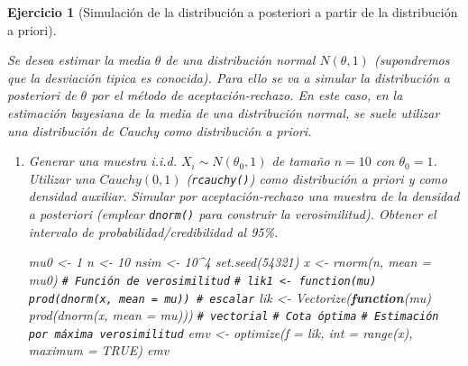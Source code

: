 \documentclass[
]{book}
\newenvironment{Shaded}{\begin{snugshade}}{\end{snugshade}}
\newcommand{\AttributeTok}[1]{\textcolor[rgb]{0.77,0.63,0.00}{#1}}
\newcommand{\CommentTok}[1]{\textcolor[rgb]{0.56,0.35,0.01}{\textit{#1}}}
\newcommand{\ConstantTok}[1]{\textcolor[rgb]{0.00,0.00,0.00}{#1}}
\newcommand{\ControlFlowTok}[1]{\textcolor[rgb]{0.13,0.29,0.53}{\textbf{#1}}}
\newcommand{\DecValTok}[1]{\textcolor[rgb]{0.00,0.00,0.81}{#1}}
\newcommand{\FunctionTok}[1]{\textcolor[rgb]{0.00,0.00,0.00}{#1}}
\newcommand{\NormalTok}[1]{#1}
\newcommand{\OtherTok}[1]{\textcolor[rgb]{0.56,0.35,0.01}{#1}}
\newcommand{\SpecialCharTok}[1]{\textcolor[rgb]{0.00,0.00,0.00}{#1}}
\theoremstyle{break}
\newtheorem{exercise}{Ejercicio}[chapter]
\theoremstyle{nonumberplain}
\renewcommand{\CommentTok}[1]{\textcolor[rgb]{0.41,0.41,0.41}{\texttt{#1}}}
\begin{document}
\begin{exercise}[Simulación de la distribución a posteriori a partir de la distribución a priori]
\protect\hypertarget{exr:post-pri-ar}{}\label{exr:post-pri-ar}

Se desea estimar la media \(\theta\) de una distribución normal \(N(\theta, 1)\) (supondremos que la desviación tipica es conocida).
Para ello se va a simular la distribución a posteriori de \(\theta\) por el método de aceptación-rechazo.
En este caso, en la estimación bayesiana de la media de una distribución normal, se suele utilizar una distribución de Cauchy como distribución a priori.

\begin{enumerate}
\def\labelenumi{\alph{enumi})}
\item
  Generar una muestra i.i.d. \(X_{i}\sim N(\theta_{0},1)\) de tamaño
  \(n=10\) con \(\theta_{0}=1\). Utilizar una \(Cauchy(0,1)\)
  (\texttt{rcauchy()}) como distribución a priori y como densidad auxiliar.
  Simular por aceptación-rechazo una muestra de la densidad a
  posteriori (emplear \texttt{dnorm()} para construir la verosimilitud).
  Obtener el intervalo de probabilidad/credibilidad al 95\%.

\begin{Shaded}
\begin{Highlighting}[]
\NormalTok{mu0 }\OtherTok{\textless{}{-}} \DecValTok{1}
\NormalTok{n }\OtherTok{\textless{}{-}} \DecValTok{10}
\NormalTok{nsim }\OtherTok{\textless{}{-}} \DecValTok{10}\SpecialCharTok{\^{}}\DecValTok{4}
\FunctionTok{set.seed}\NormalTok{(}\DecValTok{54321}\NormalTok{)}
\NormalTok{x }\OtherTok{\textless{}{-}} \FunctionTok{rnorm}\NormalTok{(n, }\AttributeTok{mean =}\NormalTok{ mu0)}
\CommentTok{\# Función de verosimilitud}
\CommentTok{\# lik1 \textless{}{-} function(mu) prod(dnorm(x, mean = mu)) \# escalar}
\NormalTok{lik }\OtherTok{\textless{}{-}} \FunctionTok{Vectorize}\NormalTok{(}\ControlFlowTok{function}\NormalTok{(mu) }\FunctionTok{prod}\NormalTok{(}\FunctionTok{dnorm}\NormalTok{(x, }\AttributeTok{mean =}\NormalTok{ mu))) }\CommentTok{\# vectorial}
\CommentTok{\# Cota óptima}
\CommentTok{\# Estimación por máxima verosimilitud}
\NormalTok{emv }\OtherTok{\textless{}{-}} \FunctionTok{optimize}\NormalTok{(}\AttributeTok{f =}\NormalTok{ lik, }\AttributeTok{int =} \FunctionTok{range}\NormalTok{(x), }\AttributeTok{maximum =} \ConstantTok{TRUE}\NormalTok{)}
\NormalTok{emv}
\end{Highlighting}
\end{Shaded}


\end{enumerate}
\end{exercise}
\end{document}
